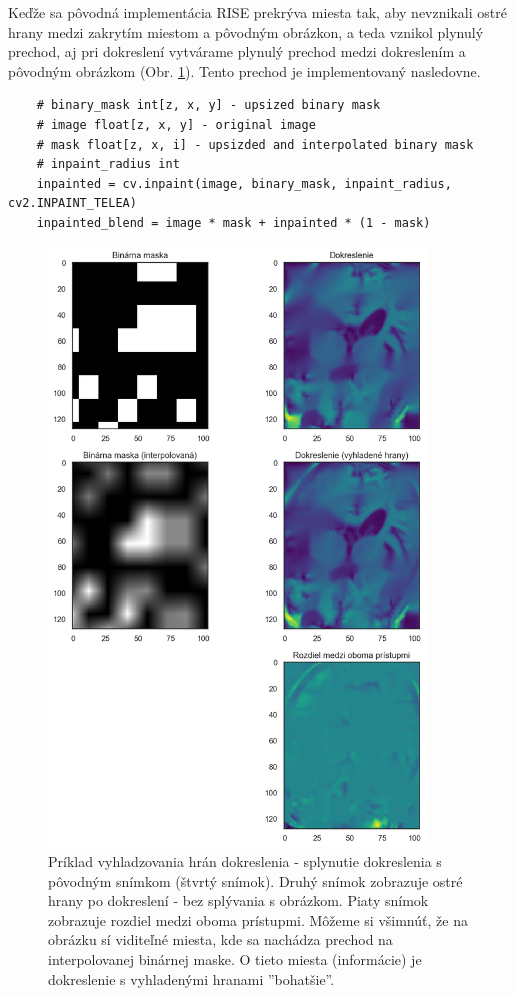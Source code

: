 Keďže sa pôvodná implementácia RISE prekrýva miesta tak, aby nevznikali ostré hrany medzi zakrytím miestom a pôvodným obrázkon, a teda vznikol plynulý prechod, aj pri dokreslení vytvárame plynulý prechod medzi dokreslením a pôvodným obrázkom (Obr. \ref{fig:inpaint_soft_corners}). Tento prechod je implementovaný nasledovne.
\begin{lstlisting}
    # binary_mask int[z, x, y] - upsized binary mask
    # image float[z, x, y] - original image
    # mask float[z, x, i] - upsizded and interpolated binary mask
    # inpaint_radius int
    inpainted = cv.inpaint(image, binary_mask, inpaint_radius, cv2.INPAINT_TELEA)
    inpainted_blend = image * mask + inpainted * (1 - mask)
\end{lstlisting}

\begin{figure}[h!]
    \centering
    \includegraphics[width=10cm]{assets/images/inpaint_soft_corners.png}
    \caption{Príklad vyhladzovania hrán dokreslenia - splynutie dokreslenia s pôvodným snímkom (štvrtý snímok). Druhý snímok zobrazuje ostré hrany po dokreslení - bez splývania s obrázkom. Piaty snímok zobrazuje rozdiel medzi oboma prístupmi. Môžeme si všimnúť, že na obrázku sí viditeľné miesta, kde sa nachádza prechod na interpolovanej binárnej maske. O tieto miesta (informácie) je dokreslenie s vyhladenými hranami ''bohatšie''.}
    \label{fig:inpaint_soft_corners}
\end{figure}

